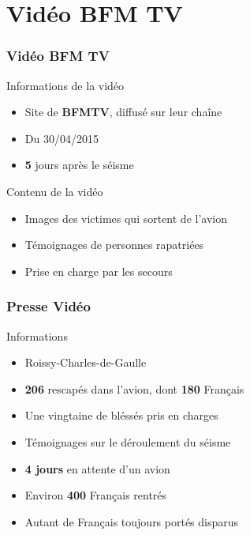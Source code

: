 \section{Vidéo BFM TV}
\begin{frame}
\frametitle{Vidéo BFM TV}
  \begin{block}{Informations de la vidéo}
    \begin{itemize}
      \item{Site de \textbf{BFMTV}, diffusé sur leur chaîne}
      \item{Du 30/04/2015}
      \item{\textbf{5} jours après le séisme}
    \end{itemize}
  \end{block} \pause
  
  \begin{block}{Contenu de la vidéo}
    \begin{itemize}
      \item{Images des victimes qui sortent de l'avion}
      \item{Témoignages de personnes rapatriées}
      \item{Prise en charge par les secours}
    \end{itemize}
  \end{block}
\end{frame}

\begin{frame}
\frametitle{Presse Vidéo}
  \begin{block}{Informations}
    \begin{itemize}
      \item{Roissy-Charles-de-Gaulle}
      \item{\textbf{206} rescapés dans l'avion, dont \textbf{180} Français}
      \item{Une vingtaine de bléssés pris en charges} \pause
      \item{Témoignages sur le déroulement du séisme}
      \item{\textbf{4 jours} en attente d'un avion} \pause
      \item{Environ \textbf{400} Français rentrés}
      \item{Autant de Français toujours portés disparus}
    \end{itemize}
  \end{block}
\end{frame}

